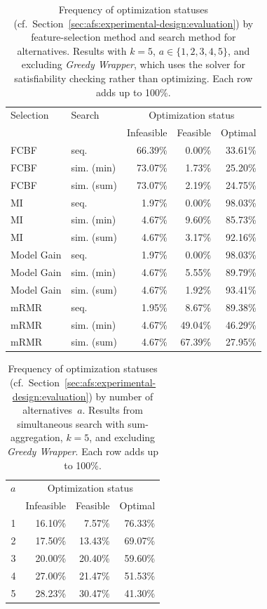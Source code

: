 \documentclass{article}
\theoremstyle{definition}
\begin{document}
\begin{table}[t]
	\centering
	\begin{tabular}{llrrr}
		\toprule
		Selection & Search & \multicolumn{3}{c}{Optimization status} \\
		\cmidrule(r){3-5}
		& & Infeasible & Feasible & Optimal \\
		\midrule
		FCBF & seq. & 66.39\% & 0.00\% & 33.61\% \\
		FCBF & sim. (min) & 73.07\% & 1.73\% & 25.20\% \\
		FCBF & sim. (sum) & 73.07\% & 2.19\% & 24.75\% \\
		MI & seq. & 1.97\% & 0.00\% & 98.03\% \\
		MI & sim. (min) & 4.67\% & 9.60\% & 85.73\% \\
		MI & sim. (sum) & 4.67\% & 3.17\% & 92.16\% \\
		Model Gain & seq. & 1.97\% & 0.00\% & 98.03\% \\
		Model Gain & sim. (min) & 4.67\% & 5.55\% & 89.79\% \\
		Model Gain & sim. (sum) & 4.67\% & 1.92\% & 93.41\% \\
		mRMR & seq. & 1.95\% & 8.67\% & 89.38\% \\
		mRMR & sim. (min) & 4.67\% & 49.04\% & 46.29\% \\
		mRMR & sim. (sum) & 4.67\% & 67.39\% & 27.95\% \\
		\bottomrule
	\end{tabular}
	\caption{
		Frequency of optimization statuses (cf.~Section~\ref{sec:afs:experimental-design:evaluation}) by feature-selection method and search method for alternatives.
		Results with $k=5$, $a \in \{1,2,3,4,5\}$, and excluding \emph{Greedy Wrapper}, which uses the solver for satisfiability checking rather than optimizing.
		Each row adds up to 100\%.
	}
	\label{tab:afs:impact-search-fs-method-optimization-status}
\end{table}

\begin{table}[t]
	\centering
	\begin{tabular}{rrrr}
		\toprule
		$a$ & \multicolumn{3}{c}{Optimization status} \\
		\cmidrule(r){2-4}
		& Infeasible & Feasible & Optimal \\
		\midrule
		1 & 16.10\% & 7.57\% & 76.33\% \\
		2 & 17.50\% & 13.43\% & 69.07\% \\
		3 & 20.00\% & 20.40\% & 59.60\% \\
		4 & 27.00\% & 21.47\% & 51.53\% \\
		5 & 28.23\% & 30.47\% & 41.30\% \\
		\bottomrule
	\end{tabular}
	\caption{
		Frequency of optimization statuses (cf.~Section~\ref{sec:afs:experimental-design:evaluation}) by number of alternatives~$a$.
		Results from simultaneous search with sum-aggregation, $k=5$, and excluding \emph{Greedy Wrapper}.
		Each row adds up to 100\%.
	}
	\label{tab:afs:impact-num-alternatives-optimization-status}
\end{table}
\end{document}
